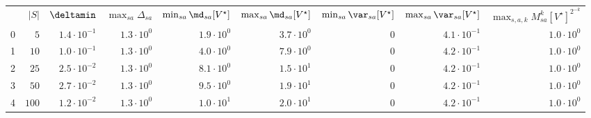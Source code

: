 \begin{tabular}{lrrrrrrrr}
 & $|S|$ & $\deltamin$ & $\max_{sa} \Delta_{sa}$ & $\min_{sa} \md_{sa}[V^\star]$ & $\max_{sa} \md_{sa}[V^\star]$ & $\min_{sa} \var_{sa}[V^\star]$ & $\max_{sa} \var_{sa}[V^\star]$ & $\max_{s,a,k} M_{sa}^k[V^\star]^{2^{-k}}$ \\
0 & $5$ & $1.4\cdot 10^{-1}$ & $1.3\cdot 10^{0}$ & $1.9\cdot 10^{0}$ & $3.7\cdot 10^{0}$ & $0$ & $4.1\cdot 10^{-1}$ & $1.0\cdot 10^{0}$ \\
1 & $10$ & $1.0\cdot 10^{-1}$ & $1.3\cdot 10^{0}$ & $4.0\cdot 10^{0}$ & $7.9\cdot 10^{0}$ & $0$ & $4.2\cdot 10^{-1}$ & $1.0\cdot 10^{0}$ \\
2 & $25$ & $2.5\cdot 10^{-2}$ & $1.3\cdot 10^{0}$ & $8.1\cdot 10^{0}$ & $1.5\cdot 10^{1}$ & $0$ & $4.2\cdot 10^{-1}$ & $1.0\cdot 10^{0}$ \\
3 & $50$ & $2.7\cdot 10^{-2}$ & $1.3\cdot 10^{0}$ & $9.5\cdot 10^{0}$ & $1.9\cdot 10^{1}$ & $0$ & $4.2\cdot 10^{-1}$ & $1.0\cdot 10^{0}$ \\
4 & $100$ & $1.2\cdot 10^{-2}$ & $1.3\cdot 10^{0}$ & $1.0\cdot 10^{1}$ & $2.0\cdot 10^{1}$ & $0$ & $4.2\cdot 10^{-1}$ & $1.0\cdot 10^{0}$ \\
\end{tabular}
